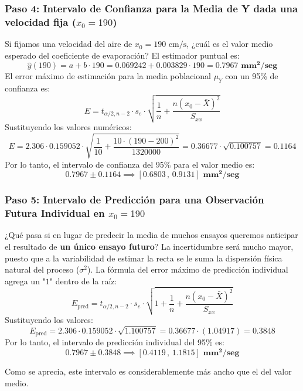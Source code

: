 \documentclass[11pt,a4paper]{article}
\begin{document}
    \subsubsection*{Paso 4: Intervalo de Confianza para la Media de Y dada una velocidad fija ($x_0 = 190$)}
    Si fijamos una velocidad del aire de $x_0 = 190 \text{ cm/s}$, ¿cuál es el valor medio esperado del coeficiente de evaporación?
    El estimador puntual es:
    \[ \hat{y}(190) = a + b \cdot 190 = 0.069242 + 0.003829 \cdot 190 = \mathbf{0.7967 \text{ mm}^2\text{/seg}} \]
    El error máximo de estimación para la media poblacional $\mu_Y$ con un 95\% de confianza es:
    \[ E = t_{\alpha/2, n-2} \cdot s_e \cdot \sqrt{\frac{1}{n} + \frac{n(x_0 - \bar{X})^2}{S_{xx}}} \]
    Sustituyendo los valores numéricos:
    \[ E = 2.306 \cdot 0.159052 \cdot \sqrt{\frac{1}{10} + \frac{10 \cdot (190 - 200)^2}{1320000}} = 0.36677 \cdot \sqrt{0.100757} = \mathbf{0.1164} \]
    Por lo tanto, el intervalo de confianza del 95\% para el valor medio es:
    \[ 0.7967 \pm 0.1164 \implies \mathbf{[0.6803 \, , \, 0.9131] \text{ mm}^2\text{/seg}} \]

    \subsubsection*{Paso 5: Intervalo de Predicción para una Observación Futura Individual en $x_0 = 190$}
    ¿Qué pasa si en lugar de predecir la media de muchos ensayos queremos anticipar el resultado de \textbf{un único ensayo futuro}? La incertidumbre será mucho mayor, puesto que a la variabilidad de estimar la recta se le suma la dispersión física natural del proceso ($\sigma^2$).
    La fórmula del error máximo de predicción individual agrega un "$1$" dentro de la raíz:
    \[ E_{\text{pred}} = t_{\alpha/2, n-2} \cdot s_e \cdot \sqrt{1 + \frac{1}{n} + \frac{n(x_0 - \bar{X})^2}{S_{xx}}} \]
    Sustituyendo los valores:
    \[ E_{\text{pred}} = 2.306 \cdot 0.159052 \cdot \sqrt{1.100757} = 0.36677 \cdot (1.04917) = \mathbf{0.3848} \]
    Por lo tanto, el intervalo de predicción individual del 95\% es:
    \[ 0.7967 \pm 0.3848 \implies \mathbf{[0.4119 \, , \, 1.1815] \text{ mm}^2\text{/seg}} \]
    
    Como se aprecia, este intervalo es considerablemente más ancho que el del valor medio.
 
\end{document}
